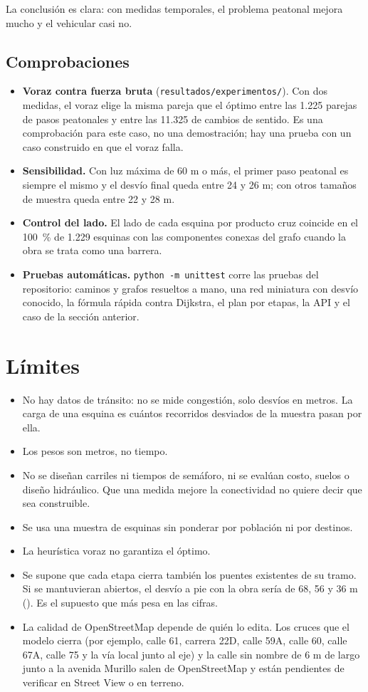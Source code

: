 \documentclass[12pt,letterpaper]{article}
\begin{document}
La conclusión es clara: con medidas temporales, el problema peatonal mejora mucho y el vehicular casi no.

\subsection{Comprobaciones}
\begin{itemize}
\item \textbf{Voraz contra fuerza bruta} (\texttt{resultados/experimentos/}). Con dos medidas, el voraz elige la misma pareja que el óptimo entre las 1.225 parejas de pasos peatonales y entre las 11.325 de cambios de sentido. Es una comprobación para este caso, no una demostración; hay una prueba con un caso construido en que el voraz falla.
\item \textbf{Sensibilidad.} Con luz máxima de 60 m o más, el primer paso peatonal es siempre el mismo y el desvío final queda entre 24 y 26 m; con otros tamaños de muestra queda entre 22 y 28 m.
\item \textbf{Control del lado.} El lado de cada esquina por producto cruz coincide en el 100~\% de 1.229 esquinas con las componentes conexas del grafo cuando la obra se trata como una barrera.
\item \textbf{Pruebas automáticas.} \texttt{python -m unittest} corre las pruebas del repositorio: caminos y grafos resueltos a mano, una red miniatura con desvío conocido, la fórmula rápida contra Dijkstra, el plan por etapas, la API y el caso de la sección anterior.
\end{itemize}

\section{Límites}
\begin{itemize}
\item No hay datos de tránsito: no se mide congestión, solo desvíos en metros. La carga de una esquina es cuántos recorridos desviados de la muestra pasan por ella.
\item Los pesos son metros, no tiempo.
\item No se diseñan carriles ni tiempos de semáforo, ni se evalúan costo, suelos o diseño hidráulico. Que una medida mejore la conectividad no quiere decir que sea construible.
\item Se usa una muestra de esquinas sin ponderar por población ni por destinos.
\item La heurística voraz no garantiza el óptimo.
\item Se supone que cada etapa cierra también los puentes existentes de su tramo. Si se mantuvieran abiertos, el desvío a pie con la obra sería de 68, 56 y 36 m (). Es el supuesto que más pesa en las cifras.
\item La calidad de OpenStreetMap depende de quién lo edita. Los cruces que el modelo cierra (por ejemplo, calle 61, carrera 22D, calle 59A, calle 60, calle 67A, calle 75 y la vía local junto al eje) y la calle sin nombre de 6 m de largo junto a la avenida Murillo salen de OpenStreetMap y están pendientes de verificar en Street View o en terreno.
\end{itemize}
\end{document}
